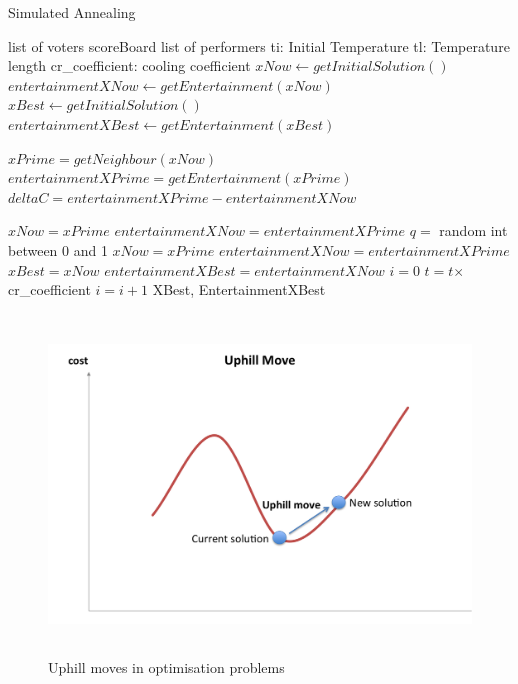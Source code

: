 \documentclass[12pt]{report}
\begin{document}
\begin{algorithm}
\caption{Simulated Annealing}
\label{simAnnealingPseudocode}
\begin{algorithmic}[1]
\REQUIRE list of voters
\REQUIRE scoreBoard
\REQUIRE list of performers
\REQUIRE ti: Initial Temperature
\REQUIRE tl: Temperature length
\REQUIRE cr\_coefficient: cooling coefficient
\STATE $xNow \leftarrow getInitialSolution()$
\STATE $entertainmentXNow \leftarrow getEntertainment(xNow)$
\STATE $xBest \leftarrow getInitialSolution()$
\STATE $entertainmentXBest \leftarrow getEntertainment(xBest)$

\STATE $xPrime = getNeighbour(xNow)$
\STATE $entertainmentXPrime = getEntertainment(xPrime)$
\STATE $deltaC = entertainmentXPrime - entertainmentXNow$

\STATE $xNow = xPrime$
\STATE $entertainmentXNow = entertainmentXPrime$
\ELSE
\STATE$q = $ random int between 0 and 1
\STATE $xNow = xPrime$
\STATE $entertainmentXNow = entertainmentXPrime$
\ENDIF
\ENDIF
{}
\STATE $xBest = xNow$
\STATE $entertainmentXBest = entertainmentXNow$
\STATE $i = 0$
\ENDIF
\ENDFOR
\STATE $t = t $$\times$cr\_coefficient
\STATE $i = i + 1$
\ENDWHILE
\RETURN XBest, EntertainmentXBest
\end{algorithmic}
\end{algorithm}

\begin{figure}[H]
\centering
\includegraphics[width=16cm, height=9cm]{./uphillmove}
\caption{Uphill moves in optimisation problems}
\label{uphillMove}
\end{figure}
\end{document}
